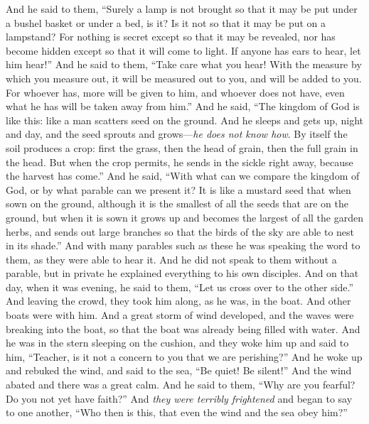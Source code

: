\begin{biblechapter}
 And he said to them, “Surely a lamp is not brought so that it may be put under a bushel basket or under a bed, is it? Is it not so that it may be put on a lampstand?
\verse For nothing is secret except so that it may be revealed, nor has become hidden except so that it will come to light.
\verse If anyone has ears to hear, let him hear!”
\verse And he said to them, “Take care what you hear! With the measure by which you measure out, it will be measured out to you, and will be added to you.
\verse For whoever has, more will be given to him, and whoever does not have, even what he has will be taken away from him.”
 And he said, “The kingdom of God is like this: like a man scatters seed on the ground.
\verse And he sleeps and gets up, night and day, and the seed sprouts and grows—\textit{he does not know how}.
\verse By itself the soil produces a crop: first the grass, then the head of grain, then the full grain in the head.
\verse But when the crop permits, he sends in the sickle right away, because the harvest has come.”
 And he said, “With what can we compare the kingdom of God, or by what parable can we present it?
\verse It is like a mustard seed that when sown on the ground, although it is the smallest of all the seeds that are on the ground,
\verse but when it is sown it grows up and becomes the largest of all the garden herbs, and sends out large branches so that the birds of the sky are able to nest in its shade.”
\verse And with many parables such as these he was speaking the word to them, as they were able to hear it.
\verse And he did not speak to them without a parable, but in private he explained everything to his own disciples.
 And on that day, when it was evening, he said to them, “Let us cross over to the other side.”
\verse And leaving the crowd, they took him along, as he was, in the boat. And other boats were with him.
\verse And a great storm of wind developed, and the waves were breaking into the boat, so that the boat was already being filled with water.
\verse And he was in the stern sleeping on the cushion, and they woke him up and said to him, “Teacher, is it not a concern to you that we are perishing?”
\verse And he woke up and rebuked the wind, and said to the sea, “Be quiet! Be silent!” And the wind abated and there was a great calm.
\verse And he said to them, “Why are you fearful? Do you not yet have faith?”
\verse And \textit{they were terribly frightened} and began to say to one another, “Who then is this, that even the wind and the sea obey him?”
\end{biblechapter}

